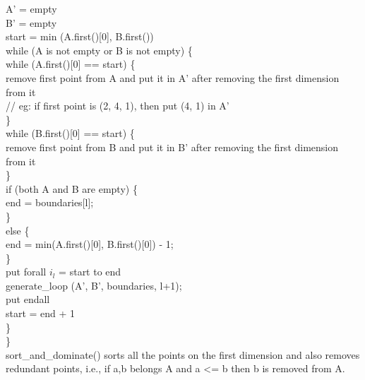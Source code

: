 \indent	A' = empty \\
\indent	B' = empty \\
\indent	start = min (A.first()[0], B.first()) \\
	
\indent	while (A is not empty or B is not empty) \{ \\
		
\indent\indent		while (A.first()[0] == start) \{ \\
\indent\indent\indent			remove first point from A and put it in A' after removing the first dimension from it \\
\indent\indent\indent			// eg: if first point is (2, 4, 1), then put (4, 1) in A' \\
\indent\indent		\} \\
\indent\indent		while (B.first()[0] == start) \{ \\
\indent\indent\indent			remove first point from B and put it in B' after removing the first dimension from it \\
\indent\indent		\} \\

\indent\indent		if (both A and B are empty) \{ \\
\indent\indent\indent			end = boundaries[l]; \\
\indent\indent		\} \\
\indent\indent		else \{ \\
\indent\indent\indent			end = min(A.first()[0], B.first()[0]) - 1; \\
\indent\indent		\} \\

\indent\indent		put forall $i_l$ = start to end \\
\indent\indent		generate\_loop (A', B', boundaries, l+1); \\
\indent\indent		put endall \\

\indent\indent		start = end + 1 \\
\indent	\} \\
\} \\	

sort\_and\_dominate() sorts all the points on the first dimension and also removes redundant points, i.e., if a,b belongs A and a <= b then b is removed from A.

